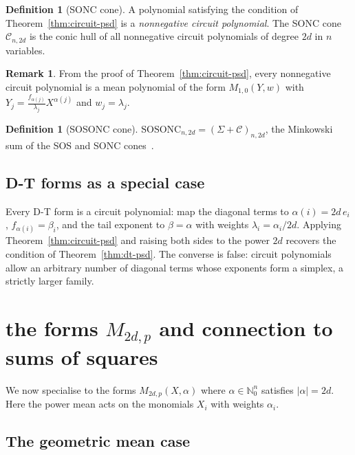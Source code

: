 \documentclass{amsart}
\theoremstyle{definition}
\newtheorem{dfn}[thm]{Definition}
\newtheorem{rem}[thm]{Remark}
\numberwithin{equation}{section}
\newcommand{\naturals}{\mathbb{N}}
\begin{document}
\begin{dfn}[SONC cone]\label{dfn:sonc}
A polynomial satisfying the condition of Theorem~\ref{thm:circuit-psd} is a
\emph{nonnegative circuit polynomial}.  The SONC cone
$\mathcal{C}_{n,2d}$ is the conic hull of all nonnegative circuit
polynomials of degree $2d$ in $n$ variables.
\end{dfn}

\begin{rem}\label{rem:sonc-means}
From the proof of Theorem~\ref{thm:circuit-psd}, every nonnegative circuit
polynomial is a mean polynomial of the form $M_{1,0}(Y,w)$ with
$Y_j=\frac{f_{\alpha(j)}}{\lambda_j}X^{\alpha(j)}$ and $w_j=\lambda_j$.
\end{rem}

\begin{dfn}[SOSONC cone]\label{dfn:sosonc}
$\mathrm{SOSONC}_{n,2d}=(\Sigma+\mathcal{C})_{n,2d}$, the Minkowski sum of
the SOS and SONC cones~\cite{DresslerSchick2025}.
\end{dfn}

\subsection{D-T forms as a special case}

Every D-T form is a circuit polynomial: map the diagonal terms to
$\alpha(i)=2d\,e_i$, $f_{\alpha(i)}=\beta_i$, and the tail exponent to
$\beta=\alpha$ with weights $\lambda_i=\alpha_i/2d$.  Applying
Theorem~\ref{thm:circuit-psd} and raising both sides to the power $2d$
recovers the condition of Theorem~\ref{thm:dt-psd}.  The converse is false:
circuit polynomials allow an arbitrary number of diagonal terms whose
exponents form a simplex, a strictly larger family.

\section{the forms $M_{2d,p}$ and connection to sums of squares}
\label{sec:M2dp-sos}

We now specialise to the forms $M_{2d,p}(X,\alpha)$ where
$\alpha\in\naturals_0^n$ satisfies $|\alpha|=2d$.  Here the power mean acts
on the monomials $X_i$ with weights $\alpha_i$.

\subsection{The geometric mean case}
\end{document}
